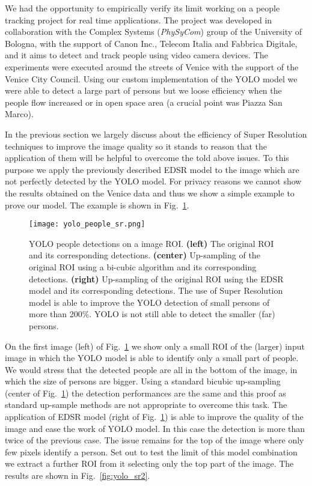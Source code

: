 \documentclass{standalone}
\begin{document}
We had the opportunity to empirically verify its limit working on a people tracking project for real time applications.
The project was developed in collaboration with the Complex Systems (\emph{PhySyCom}) group of the University of Bologna, with the support of Canon Inc., Telecom Italia and Fabbrica Digitale, and it aims to detect and track people using video camera devices.
The experiments were executed around the streets of Venice with the support of the Venice City Council.
Using our custom implementation of the YOLO model we were able to detect a large part of persons but we loose efficiency when the people flow increased or in open space area (a crucial point was Piazza San Marco).

In the previous section we largely discuss about the efficiency of Super Resolution techniques to improve the image quality so it stands to reason that the application of them will be helpful to overcome the told above issues.
To this purpose we apply the previously described EDSR model to the image which are not perfectly detected by the YOLO model.
For privacy reasons we cannot show the results obtained on the Venice data and thus we show a simple example to prove our model.
The example is shown in Fig.~\ref{fig:yolo_sr}.

\begin{figure}[htbp]
\centering
\texttt{[image: yolo\_people\_sr.png]}
\caption{YOLO people detections on a image ROI.
\textbf{(left)} The original ROI and its corresponding detections.
\textbf{(center)} Up-sampling of the original ROI using a bi-cubic algorithm and its corresponding detections.
\textbf{(right)} Up-sampling of the original ROI using the EDSR model and its corresponding detections.
The use of Super Resolution model is able to improve the YOLO detection of small persons of more than 200\%.
YOLO is not still able to detect the smaller (far) persons.
}
\label{fig:yolo_sr}
\end{figure}

On the first image (left) of Fig.~\ref{fig:yolo_sr} we show only a small ROI of the (larger) input image in which the YOLO model is able to identify only a small part of people.
We would stress that the detected people are all in the bottom of the image, in which the size of persons are bigger.
Using a standard bicubic up-sampling (center of Fig.~\ref{fig:yolo_sr}) the detection performances are the same and this proof as standard up-sample methods are not appropriate to overcome this task.
The application of EDSR model (right of Fig.~\ref{fig:yolo_sr}) is able to improve the quality of the image and ease the work of YOLO model.
In this case the detection is more than twice of the previous case.
The issue remains for the top of the image where only few pixels identify a person.
Set out to test the limit of this model combination we extract a further ROI from it selecting only the top part of the image.
The results are shown in Fig.~\ref{fig:yolo_sr2}.
\end{document}
